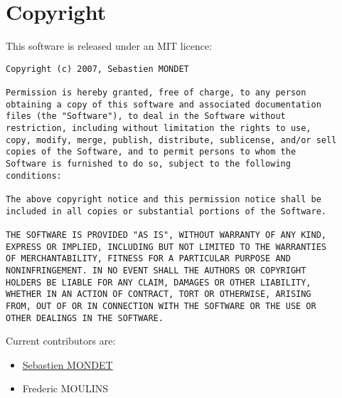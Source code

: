\section{Copyright}

This software is released under an MIT licence:

\begin{verbatim}
Copyright (c) 2007, Sebastien MONDET

Permission is hereby granted, free of charge, to any person
obtaining a copy of this software and associated documentation
files (the "Software"), to deal in the Software without
restriction, including without limitation the rights to use,
copy, modify, merge, publish, distribute, sublicense, and/or sell
copies of the Software, and to permit persons to whom the
Software is furnished to do so, subject to the following
conditions:

The above copyright notice and this permission notice shall be
included in all copies or substantial portions of the Software.

THE SOFTWARE IS PROVIDED "AS IS", WITHOUT WARRANTY OF ANY KIND,
EXPRESS OR IMPLIED, INCLUDING BUT NOT LIMITED TO THE WARRANTIES
OF MERCHANTABILITY, FITNESS FOR A PARTICULAR PURPOSE AND
NONINFRINGEMENT. IN NO EVENT SHALL THE AUTHORS OR COPYRIGHT
HOLDERS BE LIABLE FOR ANY CLAIM, DAMAGES OR OTHER LIABILITY,
WHETHER IN AN ACTION OF CONTRACT, TORT OR OTHERWISE, ARISING
FROM, OUT OF OR IN CONNECTION WITH THE SOFTWARE OR THE USE OR
OTHER DEALINGS IN THE SOFTWARE.
\end{verbatim}
Current contributors are:

\begin{itemize}
\item \href{http://sebmdt.googlepages.com}{Sebastien MONDET}
\item Frederic MOULINS
\end{itemize}





